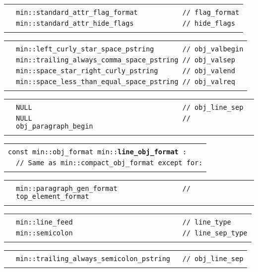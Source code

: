 \documentclass[12pt]{article}
\makeatletter
\newcommand{\TT}[1]{{\tt \bfseries #1}}
\newenvironment{indpar}[1][0.3in]%
	{\begin{list}{}%
		     {\setlength{\itemsep}{0in}%
		      \setlength{\topsep}{0in}%
		      \setlength{\parsep}{1ex}%
		      \setlength{\labelwidth}{#1}%
		      \setlength{\leftmargin}{#1}%
		      \addtolength{\leftmargin}{\labelsep}}%
	 \item}%
	{\end{list}}
\newcommand{\LABEL}[1]{\label{#1}}
\newlength{\ARGBREAKLENGTH}
\newcommand{\ARGBREAK}[1][\ARGBREAKLENGTH]{\\&\hspace*{#1}}
\newcommand{\MINLKEY}[2]%
           {\TT{#1#2}\index{min::#1@{\tt min::#1}!#2@{\tt #2}}%
                     \index{#1@{\tt #1}!#2@{\tt #2}}}
\makeatother
\begin{document}
\begin{indpar}[1em]
\vspace{-4ex}\begin{tabular}{r@{}l}\hspace*{0.1in}\ARGBREAK
\verb|min::standard_attr_flag_format           // flag_format|\ARGBREAK
\verb|min::standard_attr_hide_flags            // hide_flags|\ARGBREAK
\end{tabular}

\vspace{-4ex}\begin{tabular}{r@{}l}\hspace*{0.1in}\ARGBREAK
\verb|min::left_curly_star_space_pstring       // obj_valbegin|\ARGBREAK
\verb|min::trailing_always_comma_space_pstring // obj_valsep|\ARGBREAK
\verb|min::space_star_right_curly_pstring      // obj_valend|\ARGBREAK
\verb|min::space_less_than_equal_space_pstring // obj_valreq|\ARGBREAK
\end{tabular}

\vspace{-4ex}\begin{tabular}{r@{}l}\hspace*{0.1in}\ARGBREAK
\verb|NULL                                     // obj_line_sep|\ARGBREAK
\verb|NULL                                     // obj_paragraph_begin|\ARGBREAK
\end{tabular}

\end{indpar}

\begin{indpar}[1em]

\begin{tabular}{r@{}l}\hspace*{0.1in} \\[-3ex]
\multicolumn{2}{l}{\tt const min::obj\_format
                   min::\MINLKEY{line}{\_obj\_format}:}%
\LABEL{MIN::LINE_OBJ_FORMAT}\ARGBREAK
\verb|// Same as min::compact_obj_format except for:|\ARGBREAK
\end{tabular}

\vspace{-4ex}\begin{tabular}{r@{}l}\hspace*{0.1in}\ARGBREAK
\verb|min::paragraph_gen_format                // top_element_format|\ARGBREAK
\end{tabular}

\vspace{-4ex}\begin{tabular}{r@{}l}\hspace*{0.1in}\ARGBREAK
\verb|min::line_feed                           // line_type|\ARGBREAK
\verb|min::semicolon                           // line_sep_type|\ARGBREAK
\end{tabular}

\vspace{-4ex}\begin{tabular}{r@{}l}\hspace*{0.1in}\ARGBREAK
\verb|min::trailing_always_semicolon_pstring   // obj_line_sep|\ARGBREAK
\end{tabular}

\end{indpar}
\end{document}
